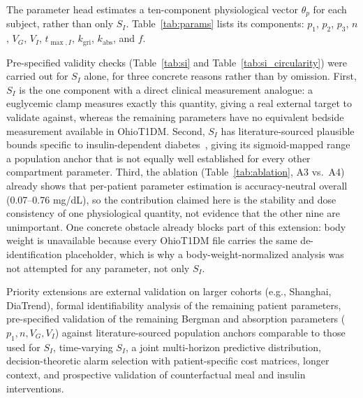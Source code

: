 \documentclass[journal]{IEEEtran}
\begin{document}
The parameter head estimates a ten-component physiological vector $\theta_p$ for each subject, rather than only $S_I$. Table~\ref{tab:params} lists its components: $p_1$, $p_2$, $p_3$, $n$, $V_G$, $V_I$, $t_{\max,I}$, $k_{\text{gri}}$, $k_{\text{abs}}$, and $f$.

Pre-specified validity checks (Table~\ref{tab:si} and Table~\ref{tab:si_circularity}) were carried out for $S_I$ alone, for three concrete reasons rather than by omission. First, $S_I$ is the one component with a direct clinical measurement analogue: a euglycemic clamp measures exactly this quantity, giving a real external target to validate against, whereas the remaining parameters have no equivalent bedside measurement available in OhioT1DM\@. Second, $S_I$ has literature-sourced plausible bounds specific to insulin-dependent diabetes~\cite{ref33}, giving its sigmoid-mapped range a population anchor that is not equally well established for every other compartment parameter. Third, the ablation (Table~\ref{tab:ablation}, A3 vs.\ A4) already shows that per-patient parameter estimation is accuracy-neutral overall (0.07--0.76 mg/dL), so the contribution claimed here is the stability and dose consistency of one physiological quantity, not evidence that the other nine are unimportant. One concrete obstacle already blocks part of this extension: body weight is unavailable because every OhioT1DM file carries the same de-identification placeholder, which is why a body-weight-normalized analysis was not attempted for any parameter, not only $S_I$.

Priority extensions are external validation on larger cohorts (e.g., Shanghai, DiaTrend), formal identifiability analysis of the remaining patient parameters, pre-specified validation of the remaining Bergman and absorption parameters ($p_1, n, V_G, V_I$) against literature-sourced population anchors comparable to those used for $S_I$, time-varying $S_I$, a joint multi-horizon predictive distribution, decision-theoretic alarm selection with patient-specific cost matrices, longer context, and prospective validation of counterfactual meal and insulin interventions.

\end{document}
